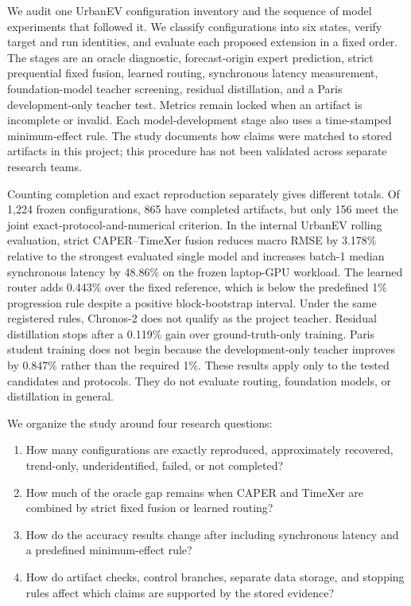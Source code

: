 We audit one UrbanEV configuration inventory and the sequence of model experiments that followed it.  We classify configurations into six states, verify target and run identities, and evaluate each proposed extension in a fixed order.  The stages are an oracle diagnostic, forecast-origin expert prediction, strict prequential fixed fusion, learned routing, synchronous latency measurement, foundation-model teacher screening, residual distillation, and a Paris development-only teacher test.  Metrics remain locked when an artifact is incomplete or invalid.  Each model-development stage also uses a time-stamped minimum-effect rule.  The study documents how claims were matched to stored artifacts in this project; this procedure has not been validated across separate research teams.

Counting completion and exact reproduction separately gives different totals.  Of 1,224 frozen configurations, 865 have completed artifacts, but only 156 meet the joint exact-protocol-and-numerical criterion.  In the internal UrbanEV rolling evaluation, strict CAPER--TimeXer fusion reduces macro RMSE by 3.178\% relative to the strongest evaluated single model and increases batch-1 median synchronous latency by 48.86\% on the frozen laptop-GPU workload.  The learned router adds 0.443\% over the fixed reference, which is below the predefined 1\% progression rule despite a positive block-bootstrap interval.  Under the same registered rules, Chronos-2 does not qualify as the project teacher.  Residual distillation stops after a 0.119\% gain over ground-truth-only training.  Paris student training does not begin because the development-only teacher improves by 0.847\% rather than the required 1\%.  These results apply only to the tested candidates and protocols.  They do not evaluate routing, foundation models, or distillation in general.

We organize the study around four research questions:

\begin{enumerate}
    \item[\textbf{RQ1}] How many configurations are exactly reproduced, approximately recovered, trend-only, underidentified, failed, or not completed?
    \item[\textbf{RQ2}] How much of the oracle gap remains when CAPER and TimeXer are combined by strict fixed fusion or learned routing?
    \item[\textbf{RQ3}] How do the accuracy results change after including synchronous latency and a predefined minimum-effect rule?
    \item[\textbf{RQ4}] How do artifact checks, control branches, separate data storage, and stopping rules affect which claims are supported by the stored evidence?
\end{enumerate}

